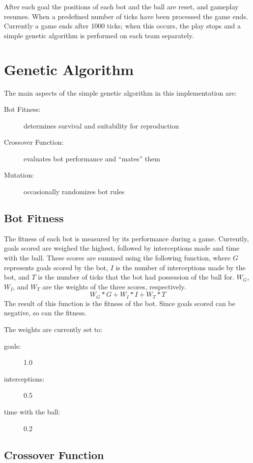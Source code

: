 \documentclass[%
        compressed,
        notitlepage,
        narroweqnarray,
        inline,
        ]{ieee}
\begin{document}
After each goal the positions of each bot and the ball are reset, and
gameplay resumes. When a predefined number of ticks have been processed the
game ends. Currently a game ends after 1000 ticks; when this occurs, the
play stops and a simple genetic algorithm is performed on each team
separately.

\section{Genetic Algorithm}

The main aspects of the simple genetic algorithm in this implementation are:
\nopagebreak
\begin{description}
\item[Bot Fitness:] determines survival and suitability for reproduction
\item[Crossover Function:] evaluates bot performance and ``mates'' them
\item[Mutation:] occasionally randomizes bot rules
\end{description}

\subsection{Bot Fitness}

The fitness of each bot is measured by its performance during a game.
Currently, goals scored are weighed the highest, followed by interceptions
made and time with the ball. These scores are summed using the following
function, where $G$ represents goals scored by the bot, $I$ is the number of
interceptions made by the bot, and $T$ is the number of ticks that the bot
had possession of the ball for. $W_{G}$, $W_{I}$, and $W_{T}$ are the
weights of the three scores, respectively.
\begin{displaymath}
W_{G} * G + W_{I} * I + W_{T} * T
\end{displaymath}
The result of this function is the fitness of the bot. Since goals scored
can be negative, so can the fitness.

The weights are currently set to:
\nopagebreak
\begin{description}
\item[goals:] 1.0
\item[interceptions:] 0.5
\item[time with the ball:] 0.2
\end{description}

\subsection{Crossover Function}
\end{document}
